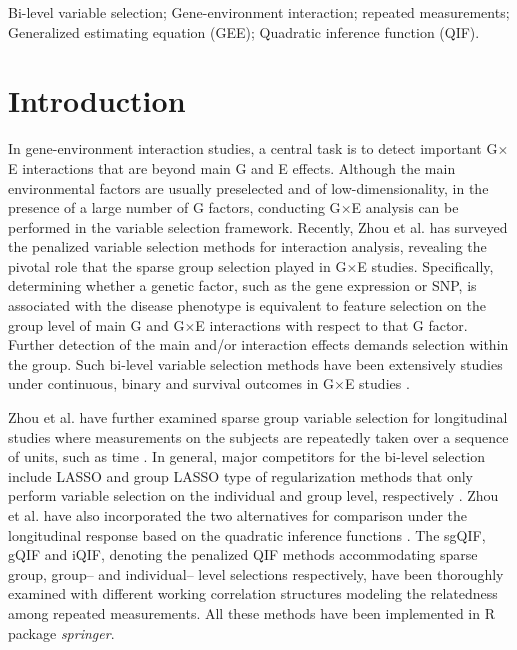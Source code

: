 \documentclass[12pt]{article}
\begin{document}
 Bi-level variable selection; Gene-environment interaction; repeated measurements; Generalized estimating equation (GEE); Quadratic inference function (QIF). 

\section{Introduction}

In gene-environment interaction studies, a central task is to detect  important G$\times$E interactions that are beyond main G and E effects. Although the  main environmental factors are usually preselected and of low-dimensionality, in the presence of a large number of G factors, conducting G$\times$E analysis can be performed in the variable selection framework. Recently, Zhou et al. \cite{zhou2021gene} has surveyed the penalized variable selection methods for interaction analysis, revealing the pivotal role that the sparse group selection played in G$\times$E studies. Specifically, determining whether a genetic factor, such as the gene expression or SNP, is associated with the disease phenotype is equivalent to feature selection on the group level of main G and G$\times$E interactions with respect to that G factor. Further detection of the main and/or interaction effects demands selection within the group. Such bi-level variable selection methods have been extensively studies under continuous, binary and survival outcomes in G$\times$E studies \cite{wu2018dissecting,ren2022gene,ren2022robust,liu2022tree}.   


Zhou et al. \cite{zhou2022sparse} have further examined sparse group variable selection for longitudinal studies where measurements on the subjects are repeatedly taken over a sequence of units, such as time \cite{verbeke2014analysis}. In general, major competitors for the bi-level selection include LASSO and group LASSO type of regularization methods that only perform variable selection on the individual and group level, respectively \cite{WuMa2015}. Zhou et al. \cite{zhou2022sparse} have also incorporated the two alternatives for comparison under the longitudinal response based on the quadratic inference functions \cite{qu2000improving}. The sgQIF, gQIF and iQIF, denoting the penalized QIF methods accommodating sparse group, group-- and individual-- level selections respectively, have been thoroughly examined with different working correlation structures modeling the relatedness among repeated measurements. All these methods have been implemented in R package \emph{springer}.
\end{document}
